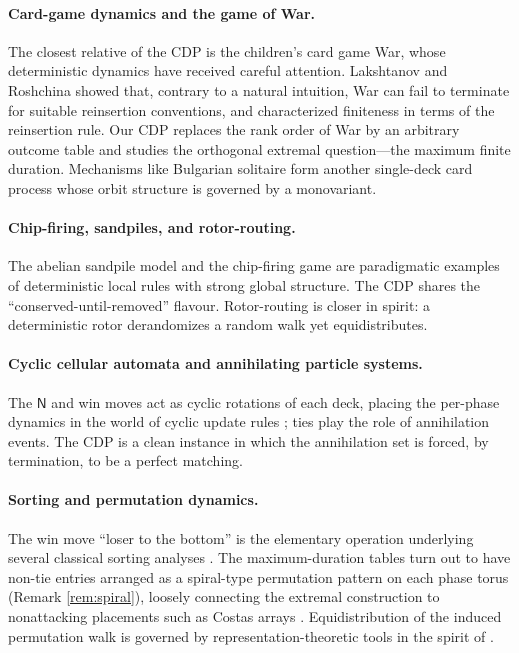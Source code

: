 \documentclass[11pt]{article}
\theoremstyle{definition}
\theoremstyle{remark}
\newcommand{\NN}{\mathsf{N}}
\begin{document}
\paragraph{Card-game dynamics and the game of War.} The closest relative of the CDP is the children's card game War, whose deterministic dynamics have received careful attention. Lakshtanov and Roshchina \cite{LR} showed that, contrary to a natural intuition, War can fail to terminate for suitable reinsertion conventions, and characterized finiteness in terms of the reinsertion rule. Our CDP replaces the rank order of War by an arbitrary outcome table and studies the orthogonal extremal question---the maximum finite duration. Mechanisms like Bulgarian solitaire \cite{Brandt} form another single-deck card process whose orbit structure is governed by a monovariant.

\paragraph{Chip-firing, sandpiles, and rotor-routing.} The abelian sandpile model and the chip-firing game \cite{Dhar, Bjorner, LevinePeres} are paradigmatic examples of deterministic local rules with strong global structure. The CDP shares the ``conserved-until-removed'' flavour. Rotor-routing \cite{Holroyd} is closer in spirit: a deterministic rotor derandomizes a random walk yet equidistributes.

\paragraph{Cyclic cellular automata and annihilating particle systems.} The $\NN$ and win moves act as cyclic rotations of each deck, placing the per-phase dynamics in the world of cyclic update rules \cite{Fisch, Bramson}; ties play the role of annihilation events. The CDP is a clean instance in which the annihilation set is forced, by termination, to be a perfect matching.

\paragraph{Sorting and permutation dynamics.} The win move ``loser to the bottom'' is the elementary operation underlying several classical sorting analyses \cite{Knuth}. The maximum-duration tables turn out to have non-tie entries arranged as a spiral-type permutation pattern on each phase torus (Remark \ref{rem:spiral}), loosely connecting the extremal construction to nonattacking placements such as Costas arrays \cite{Golomb}. Equidistribution of the induced permutation walk is governed by representation-theoretic tools in the spirit of \cite{Diaconis, Stanley}.
\end{document}
